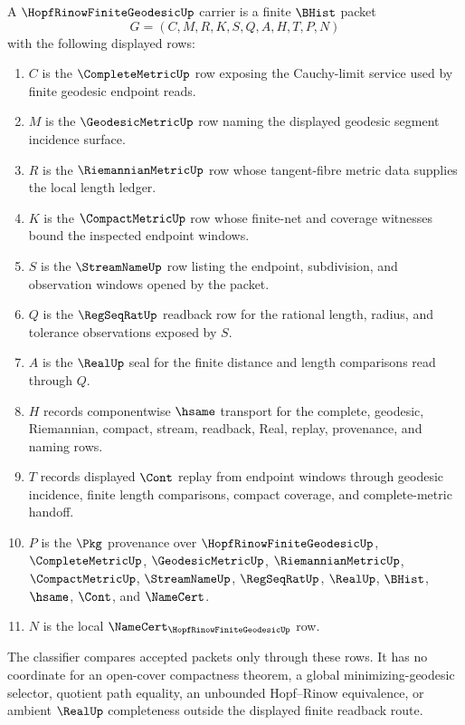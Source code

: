 \begin{definition}
\label{def:hopf-rinow-finite-geodesic-carrier}
A $\HopfRinowFiniteGeodesicUp$ carrier is a finite $\BHist$ packet
$$
G=(C,M,R,K,S,Q,A,H,T,P,N)
$$
with the following displayed rows:
\begin{enumerate}
\item $C$ is the $\CompleteMetricUp$ row exposing the Cauchy-limit service used by finite geodesic endpoint reads.
\item $M$ is the $\GeodesicMetricUp$ row naming the displayed geodesic segment incidence surface.
\item $R$ is the $\RiemannianMetricUp$ row whose tangent-fibre metric data supplies the local length ledger.
\item $K$ is the $\CompactMetricUp$ row whose finite-net and coverage witnesses bound the inspected endpoint windows.
\item $S$ is the $\StreamNameUp$ row listing the endpoint, subdivision, and observation windows opened by the packet.
\item $Q$ is the $\RegSeqRatUp$ readback row for the rational length, radius, and tolerance observations exposed by $S$.
\item $A$ is the $\RealUp$ seal for the finite distance and length comparisons read through $Q$.
\item $H$ records componentwise $\hsame$ transport for the complete, geodesic, Riemannian, compact, stream, readback, Real, replay, provenance, and naming rows.
\item $T$ records displayed $\Cont$ replay from endpoint windows through geodesic incidence, finite length comparisons, compact coverage, and complete-metric handoff.
\item $P$ is the $\Pkg$ provenance over $\HopfRinowFiniteGeodesicUp$, $\CompleteMetricUp$, $\GeodesicMetricUp$, $\RiemannianMetricUp$, $\CompactMetricUp$, $\StreamNameUp$, $\RegSeqRatUp$, $\RealUp$, $\BHist$, $\hsame$, $\Cont$, and $\NameCert$.
\item $N$ is the local $\NameCert_{\HopfRinowFiniteGeodesicUp}$ row.
\end{enumerate}
The classifier compares accepted packets only through these rows. It has no coordinate for an open-cover compactness theorem, a global minimizing-geodesic selector, quotient path equality, an unbounded Hopf--Rinow equivalence, or ambient $\RealUp$ completeness outside the displayed finite readback route.
\end{definition}

